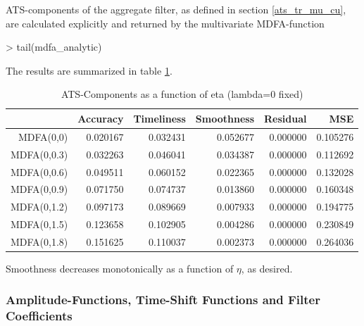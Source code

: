 \documentclass[a4paper]{book}
\begin{document}
ATS-components of the aggregate filter, as defined in section \ref{ats_tr_mu_cu}, are calculated explicitly and returned by the multivariate MDFA-function
\begin{Schunk}
\begin{Sinput}
> tail(mdfa_analytic)
\end{Sinput}
\begin{Soutput}
187     else {                                                                      
188         return(list(b = b, trffkt = trffkt, rever = rever, Accuracy = Accuracy, 
189             Smoothness = Smoothness, Timeliness = Timeliness,                   
190             MS_error = MS_error))                                               
191     }                                                                           
192 }                                                                               
\end{Soutput}
\end{Schunk}
The results are summarized in table \ref{ats_comp_mdfa_S}.
\begin{table}[ht]
\centering
\begin{tabular}{rrrrrr}
  \hline
 & Accuracy & Timeliness & Smoothness & Residual & MSE \\ 
  \hline
MDFA(0,0) & 0.020167 & 0.032431 & 0.052677 & 0.000000 & 0.105276 \\ 
  MDFA(0,0.3) & 0.032263 & 0.046041 & 0.034387 & 0.000000 & 0.112692 \\ 
  MDFA(0,0.6) & 0.049511 & 0.060152 & 0.022365 & 0.000000 & 0.132028 \\ 
  MDFA(0,0.9) & 0.071750 & 0.074737 & 0.013860 & 0.000000 & 0.160348 \\ 
  MDFA(0,1.2) & 0.097173 & 0.089669 & 0.007933 & 0.000000 & 0.194775 \\ 
  MDFA(0,1.5) & 0.123658 & 0.102905 & 0.004286 & 0.000000 & 0.230849 \\ 
  MDFA(0,1.8) & 0.151625 & 0.110037 & 0.002373 & 0.000000 & 0.264036 \\ 
   \hline
\end{tabular}
\caption{ATS-Components as a function of eta (lambda=0 fixed)} 
\label{ats_comp_mdfa_S}
\end{table}Smoothness decreases  monotonically as a function of $\eta$, as desired.



\subsubsection{Amplitude-Functions, Time-Shift Functions and Filter Coefficients}
\end{document}
